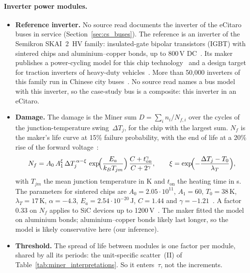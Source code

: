 \documentclass[11pt,a4paper]{article}
\theoremstyle{plain}
\theoremstyle{definition}
\theoremstyle{remark}
\begin{document}
\paragraph{Inverter power modules.}
\begin{itemize}
  \item \textbf{Reference inverter.}
    No source read documents the inverter of the eCitaro buses in service (Section~\ref{sec:cs_buses}).
    The reference is an inverter of the Semikron SKAI~2~HV family: insulated-gate bipolar transistors (IGBT) with sintered chips and aluminium--copper bonds, up to 800\,V DC~\cite{SemikronSKAI2HV}.
    Its maker publishes a power-cycling model for this chip technology~\cite[Table~3]{Wintrich2024} and a design target for traction inverters of heavy-duty vehicles~\cite{Backhaus2019}.
    More than 50,000 inverters of this family run in Chinese city buses~\cite{Backhaus2020}.
    No source read names a bus model with this inverter, so the case-study bus is a composite: this inverter in an eCitaro.
  \item \textbf{Damage.}
    The damage is the Miner sum $D = \sum_i n_i/N_{f,i}$ over the cycles of the junction-temperature swing~$\Delta T_j$, for the chip with the largest sum.
    $N_f$ is the maker's life curve at 15\% failure probability, with the end of life at a 20\% rise of the forward voltage~\cite[Sec.~1.2]{Wintrich2024}:
    \begin{equation}\label{eq:cs_nf}
      N_f = A_0\, A_1^{\xi}\, \Delta T_j^{\,\alpha - \xi}\, \exp\!\Bigl(\frac{E_a}{k_B T_{jm}}\Bigr)\, \frac{C + t_{\mathrm{on}}^{\gamma}}{C + 2^{\gamma}},
      \qquad
      \xi = \exp\!\Bigl(-\frac{\Delta T_j - T_0}{\lambda_T}\Bigr),
    \end{equation}
    with $T_{jm}$ the mean junction temperature in K and $t_{\mathrm{on}}$ the heating time in s.
    The parameters for sintered chips are $A_0 = 2.05 \cdot 10^{11}$, $A_1 = 60$, $T_0 = 38$\,K, $\lambda_T = 17$\,K, $\alpha = -4.3$, $E_a = 2.54 \cdot 10^{-20}$\,J, $C = 1.44$ and $\gamma = -1.21$~\cite[Table~3]{Wintrich2024}.
    A factor 0.33 on $N_f$ applies to SiC devices up to 1200\,V~\cite[Sec.~2.5]{Wintrich2024}.
    The maker fitted the model on aluminium bonds; aluminium--copper bonds likely last longer, so the model is likely conservative here (our inference).
  \item \textbf{Threshold.}
    The spread of life between modules is one factor per module, shared by all its periods: the unit-specific scatter~(II) of Table~\ref{tab:miner_interpretations}.
    So it enters~$\tau$, not the increments.

\end{itemize}
\end{document}
